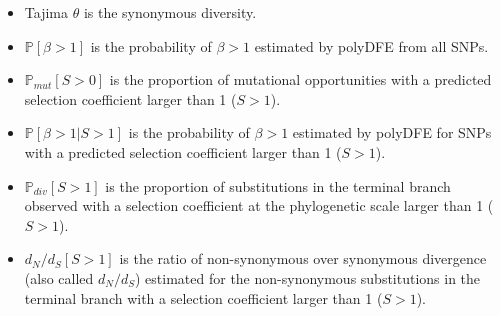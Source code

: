 \documentclass{article}
\newcommand{\dn}{d_N}
\newcommand{\ds}{d_S}
\newcommand{\dnds}{\dn / \ds}
\newcommand{\Sphy}{S}
\newcommand{\Spop}{\beta}
\begin{document}
    \begin{itemize}
        \item Tajima $\theta$ is the synonymous diversity.
        \item $\mathbb{P} [ \Spop > 1 ]$ is the probability of $\Spop > 1$ estimated by polyDFE from all SNPs.
        \item $\mathbb{P}_{mut}[\Sphy > 0]$ is the proportion of mutational opportunities with a predicted selection coefficient larger than 1 ($\Sphy > 1$).
        \item $\mathbb{P} [ \Spop > 1  | \Sphy > 1]$ is the probability of $\Spop > 1$ estimated by polyDFE for SNPs with a predicted selection coefficient larger than 1 ($\Sphy > 1$).
        \item $\mathbb{P}_{div}[\Sphy > 1]$ is the proportion of substitutions in the terminal branch observed with a selection coefficient at the phylogenetic scale larger than 1 ($\Sphy > 1$).
        \item $\dnds[\Sphy > 1]$ is the ratio of non-synonymous over synonymous divergence (also called $\dnds$) estimated for the non-synonymous substitutions in the terminal branch with a selection coefficient larger than 1 ($\Sphy > 1$).
    \end{itemize}
\end{document}
